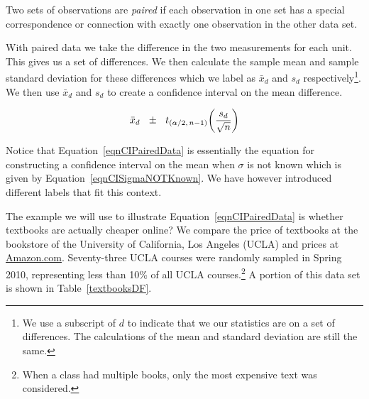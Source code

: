 \begin{termBox}{
Two sets of observations are \emph{paired} if each observation in one set has a special correspondence or connection with exactly one observation in the other data set.}
\end{termBox}


With paired data we take the difference in the two measurements for each unit.
This gives us a set of differences.
We then calculate the sample mean and sample standard deviation for these differences
which we label as $\bar{x}_{d}$ and $s_{d}$ respectively\footnote{We use a subscript of $d$ to indicate that we our statistics are on a set of differences. The calculations of the mean and standard deviation are still the same.}.
We then use $\bar{x}_{d}$ and $s_{d}$ to create a confidence interval on the mean difference.


\begin{termBox}{
\begin{equation}
\bar{x}_{d}	 ~~ \pm ~~  t_{(\alpha / 2, \, n-1)}  \bigg( \frac{ s_{d} }{ \sqrt{n} } \bigg)\label{eqnCIPairedData}\\
\end{equation}
}
\end{termBox}

Notice that Equation~\ref{eqnCIPairedData} is essentially the equation for constructing a confidence interval on the mean when $\sigma$ is not known which is
given by Equation~\ref{eqnCISigmaNOTKnown}.
We have however introduced different labels that fit this context.


The example we will use to illustrate Equation~\eqref{eqnCIPairedData} is whether textbooks are actually cheaper online? We compare the price of textbooks at the bookstore
of the University of California, Los Angeles (UCLA) and prices at %
\href{http://www.amazon.com}{Amazon.com}.
Seventy-three UCLA courses were randomly sampled in Spring 2010, representing less than 10\% of all UCLA courses.\footnote{When a class had multiple books, only the most expensive text was considered.} A portion of this data set is shown in Table~\ref{textbooksDF}.

